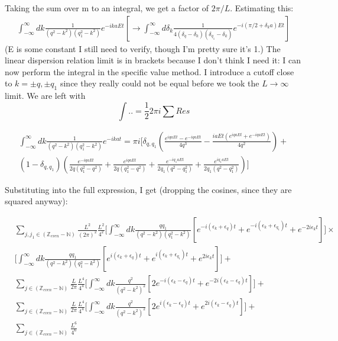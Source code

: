 \documentclass[a4paper]{article}
\begin{document}
Taking the sum over m to an integral, we get a factor of $2\pi/L$. Estimating this:
\begin{gather*}
\int_{-\infty}^{\infty}dk \frac{1}{(q^2 - k^2)(q_1^2 - k^2)}e^{-i k a E t} [\rightarrow
\int_{-\infty}^{\infty}d\delta_k \frac{1}{4(\delta_q - \delta_k)(\delta_{q_1} - \delta_k)}e^{-i (\pi/2 + \delta_k a)E t}]
\end{gather*} 
(E is some constant I still need to verify, though I'm pretty sure it's 1.)\newline
The linear dispersion relation limit is in brackets because I don't think I need it: I can now perform the integral in the specific value method. I introduce a cutoff close to $k = \pm q, \pm q_1$ since they really could not be equal before we took the $L\rightarrow\infty$ limit. We are left with 
\[ \int .. = \frac{1}{2}2 \pi i \sum Res  \]

\begin{gather*}
\int_{-\infty}^{\infty}dk \frac{1}{(q^2 - k^2)(q_1^2 - k^2)}e^{-i k a t} = \pi i \big[ \delta_{q, q_1} (\frac{e^{iqaEt} - e^{-iqaEt}}{4q^3} - \frac{iaEt(e^{iqaEt} + e^{-iqaEt})}{4q^2}) + \\
(1 - \delta_{q, q_1})(\frac{e^{-iqaEt}}{2q(q_1^2 - q^2)} + \frac{e^{iqaEt}}{2q(q_1^2 - q^2)} + \frac{e^{-iq_1aEt}}{2q_1(q^2 - q_1^2)} + \frac{e^{iq_1aEt}}{2q_1(q^2 - q_1^2)})
\big]
\end{gather*} 

Substituting into the full expression, I get (dropping the cosines, since they are squared anyway):

\begin{align}
& \sum_{j, j_1 \in (\mathbb{Z}_{even} - \mathbb{N})}\frac{L^2}{(2\pi)^2} \frac{L^2}{4^2}\big[\int_{-\infty}^{\infty} dk \frac{qq_1}{(q^2 - k^2)(q_1^2 - k^2)}[e^{-i(\epsilon_k + \epsilon_q)t} + e^{-i(\epsilon_k + \epsilon_{q_1})t} + e^{-2i\epsilon_k t}] \big] \times \\
& \big[\int_{-\infty}^{\infty} dk \frac{qq_1}{(q^2 - k^2)(q_1^2 - k^2)}[e^{i(\epsilon_k + \epsilon_q)t} + e^{i(\epsilon_k + \epsilon_{q_1})t} + e^{2i\epsilon_k t}] \big] + \\
& \sum_{j \in (\mathbb{Z}_{even} - \mathbb{N})} \frac{L}{2\pi}\frac{L^4}{4^4}\big[\int_{-\infty}^{\infty} dk \frac{q^2}{(q^2 - k^2)^2}[2e^{-i(\epsilon_k - \epsilon_q)t}  + e^{-2i(\epsilon_k -\epsilon_q)t}] \big] + \\
& \sum_{j \in (\mathbb{Z}_{even} - \mathbb{N})} \frac{L}{2\pi}\frac{L^4}{4^4}\big[\int_{-\infty}^{\infty} dk \frac{q^2}{(q^2 - k^2)^2}[2e^{i(\epsilon_k - \epsilon_q)t}  + e^{2i(\epsilon_k -\epsilon_q)t}] \big] + \\
& \sum_{j \in (\mathbb{Z}_{even} - \mathbb{N})} \frac{L^6}{4^6}
\end{align}
\end{document}
